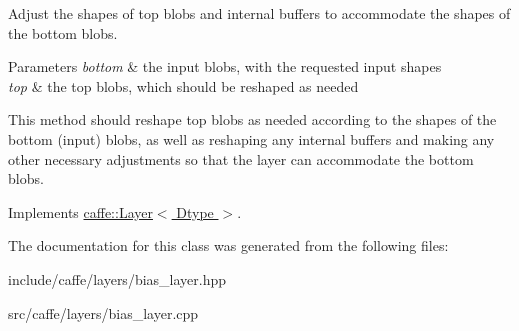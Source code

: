 Adjust the shapes of top blobs and internal buffers to accommodate the shapes of the bottom blobs. 


\begin{DoxyParams}{Parameters}
{\em bottom} & the input blobs, with the requested input shapes \\
\hline
{\em top} & the top blobs, which should be reshaped as needed\\
\hline
\end{DoxyParams}
This method should reshape top blobs as needed according to the shapes of the bottom (input) blobs, as well as reshaping any internal buffers and making any other necessary adjustments so that the layer can accommodate the bottom blobs. 

Implements \hyperlink{classcaffe_1_1Layer_ad9d391b972c769c0ebee34ca6d1c973e}{caffe\+::\+Layer$<$ Dtype $>$}.



The documentation for this class was generated from the following files\+:\begin{DoxyCompactItemize}
\item 
include/caffe/layers/bias\+\_\+layer.\+hpp\item 
src/caffe/layers/bias\+\_\+layer.\+cpp\end{DoxyCompactItemize}
